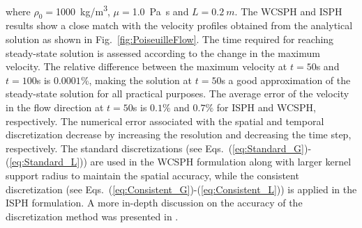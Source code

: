 \noindent where $\rho_0=$\SI{1000}{kg/m^3}, $\mu=$\SI{1.0}{Pa.s} and $L=\SI{0.2}{m}$. The WCSPH and ISPH results show a close match with the velocity profiles obtained from the analytical solution as shown in Fig.~\ref{fig:PoiseuilleFlow}. The time required for reaching steady-state solution is assessed according to the change in the maximum velocity. The relative difference between the maximum velocity at $t=50$\si{s} and $t=100$\si{s} is $0.0001$\%, making the solution at $t=50$\si{s} a good approximation of the steady-state solution for all practical purposes. The average error of the velocity in the flow direction at $t=50$\si{s} is $0.1\%$ and $0.7\%$ for ISPH and WCSPH, respectively. The numerical error associated with the spatial and temporal discretization decrease by increasing the resolution and decreasing the time step, respectively. The standard discretizations (see Eqs.~(\ref{eq:Standard_G})-(\ref{eq:Standard_L})) are used in the WCSPH formulation along with larger kernel support radius to maintain the spatial accuracy, while the consistent discretization (see Eqs.~(\ref{eq:Consistent_G})-(\ref{eq:Consistent_L})) is applied in the ISPH formulation.  A more in-depth discussion on the accuracy of the discretization method was presented in \cite{weiWenxiaoDanMultiresolution2017}. 

